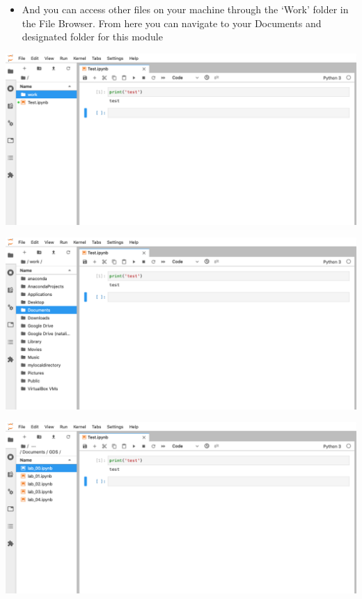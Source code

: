 \documentclass[
]{book}
\providecommand{\tightlist}{%
  \setlength{\itemsep}{0pt}\setlength{\parskip}{0pt}}
\begin{document}
\begin{itemize}
\tightlist
\item
  And you can access other files on your machine through the `Work' folder in the File Browser. From here you can navigate to your Documents and designated folder for this module
\end{itemize}

\begin{center}\includegraphics[width=14.93in]{figs/chp1/Figure15a} \end{center}

\begin{center}\includegraphics[width=14.93in]{figs/chp1/Figure15b} \end{center}

\begin{center}\includegraphics[width=14.93in]{figs/chp1/Figure15c} \end{center}
\end{document}

